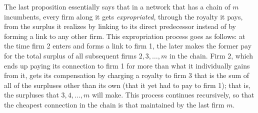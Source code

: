 \documentclass{article}
\newtheorem{remark}{Remark}
\begin{document}
The last proposition essentially says that in a network that has a chain of $m$ incumbents, every firm along it gets \textit{expropriated}, through the royalty it pays, from the surplus it realizes by linking to its direct predecessor instead of by forming a link to any other firm. This expropriation process goes as follows: at the time firm 2 enters and forms a link to firm 1, the later makes the former pay for the total surplus of all subsequent firms $2,3,\ldots,m$ in the chain. Firm $2$, which ends up paying its connection to firm 1 for more than what it individually gains from it, gets its compensation by charging a royalty to firm 3 that is the sum of all of the surpluses other than its own (that it yet had to pay to firm 1); that is, the surpluses that $3,4,\ldots ,m$ will make. This process continues recursively, so that the cheapest connection in the chain is that maintained by the last firm $m$. 


\end{document}
